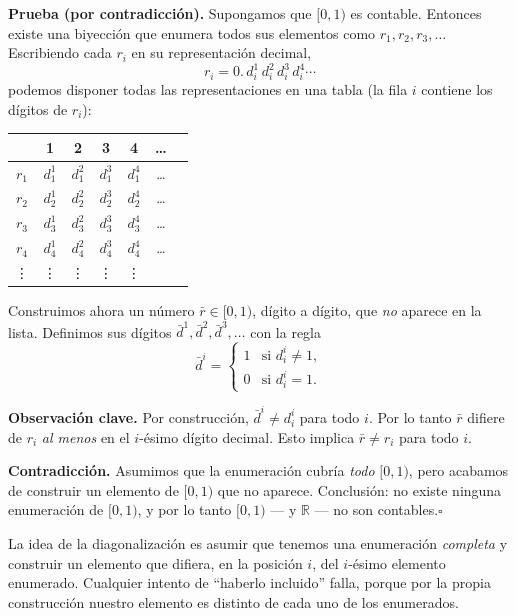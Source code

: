 \documentclass[11pt,a4paper]{article}
\theoremstyle{definicion}
\newcommand{\R}{\mathbb{R}}
\begin{document}
\textbf{Prueba (por contradicción).} Supongamos que $[0, 1)$ es contable. Entonces existe una biyección que enumera todos sus elementos como $r_1, r_2, r_3, \dots$ Escribiendo cada $r_i$ en su representación decimal,
\[
r_i = 0.\,d^1_i\, d^2_i\, d^3_i\, d^4_i \cdots
\]
podemos disponer todas las representaciones en una tabla (la fila $i$ contiene los dígitos de $r_i$):

\begin{center}
\begin{tabular}{c|cccccc}
& 1 & 2 & 3 & 4 & \dots \\
\hline
$r_1$ & $d^1_1$ & $d^2_1$ & $d^3_1$ & $d^4_1$ & \dots \\
$r_2$ & $d^1_2$ & $d^2_2$ & $d^3_2$ & $d^4_2$ & \dots \\
$r_3$ & $d^1_3$ & $d^2_3$ & $d^3_3$ & $d^4_3$ & \dots \\
$r_4$ & $d^1_4$ & $d^2_4$ & $d^3_4$ & $d^4_4$ & \dots \\
\vdots & \vdots & \vdots & \vdots & \vdots
\end{tabular}
\end{center}

Construimos ahora un número $\bar r \in [0,1)$, dígito a dígito, que \emph{no} aparece en la lista. Definimos sus dígitos $\bar d^1, \bar d^2, \bar d^3, \dots$ con la regla
\[
\bar d^i = \begin{cases} 1 & \text{si } d^i_i \neq 1, \\ 0 & \text{si } d^i_i = 1. \end{cases}
\]

\textbf{Observación clave.} Por construcción, $\bar d^i \neq d^i_i$ para todo $i$. Por lo tanto $\bar r$ difiere de $r_i$ \emph{al menos} en el $i$-ésimo dígito decimal. Esto implica $\bar r \neq r_i$ para todo $i$.

\textbf{Contradicción.} Asumimos que la enumeración cubría \emph{todo} $[0, 1)$, pero acabamos de construir un elemento de $[0, 1)$ que no aparece. Conclusión: no existe ninguna enumeración de $[0, 1)$, y por lo tanto $[0, 1)$ --- y $\R$ --- no son contables.\hfill$\square$

\begin{intuicion}
La idea de la diagonalización es asumir que tenemos una enumeración \emph{completa} y construir un elemento que difiera, en la posición $i$, del $i$-ésimo elemento enumerado. Cualquier intento de ``haberlo incluido'' falla, porque por la propia construcción nuestro elemento es distinto de cada uno de los enumerados.
\end{intuicion}
\end{document}
